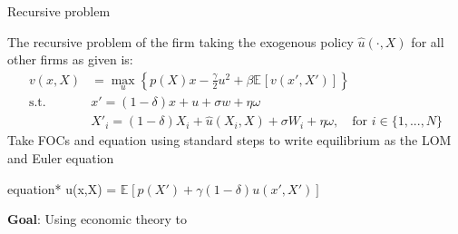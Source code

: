 \documentclass[aspectratio=169,10pt]{beamer}
\newcommand{\emphcolor}[1]{\textbf{\textcolor{emphcolorval}{#1}}}
\newcommand{\expec}[2][]{\ensuremath{\mathbb{E}_{{#1}}\left[ {#2} \right]}}
\begin{document}
	\begin{frame}{Recursive problem}
	
	
	The recursive problem of the firm taking the exogenous policy $\hat{u}(\cdot, X)$ for all other firms as given is:
	\begin{align*}
		v(x,X)       & =\max_{u}\left\{p(X)x -  \frac{\gamma}{2} u^2 + \beta \expec{v(x',X')}\right\}                      \\
		\text{s.t. } & x' = (1-\delta)x + u + \sigma w + \eta \omega                                                       \\
		& X'_i = (1-\delta)X_i + \hat{u}(X_i,X) + \sigma W_i + \eta \omega,\quad\text{for } i \in \{1,...,N\}\end{align*}
	Take FOCs and equation using standard steps to write equilibrium as the LOM and Euler equation
	\begin{empheq}[box=\tcbhighmath]{equation*}
		\gamma u(x,X) = \beta \expec{p(X')+\gamma (1-\delta) u(x',X') }
	\end{empheq}
	\emphcolor{Goal}: Using economic theory to
	

\end{frame}
	
\end{document}

